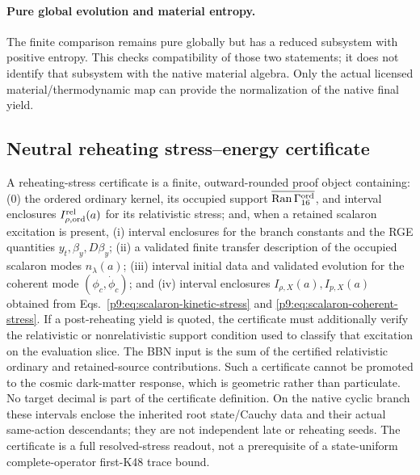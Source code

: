 \documentclass[12pt,a4paper]{article}
\begin{document}
\paragraph{Pure global evolution and material entropy.}
The finite comparison remains pure globally but has a reduced subsystem
with positive entropy. This checks compatibility of those two statements;
it does not identify that subsystem with the native material algebra.
Only the actual licensed material/thermodynamic map can provide the
normalization of the native final yield.



\subsection{Neutral reheating stress--energy certificate}
\label{p9:app:scalaron-abundance-certificate}

\begin{definition}
\label{p9:def:scalaron-abundance-certificate-datum}
A reheating-stress certificate is a finite, outward-rounded proof object
containing: (0) the ordered ordinary kernel, its occupied support
\(\overline{\operatorname{Ran}\Gamma_{16}^{\rm ord}}\), and interval
enclosures \(I_{\rho,\rm ord}^{\rm rel}(a)\) for its relativistic stress; and,
when a retained scalaron excitation is present, (i) interval enclosures for
the branch constants and the RGE quantities
\(y_t,\beta_y,D\beta_y\); (ii) a validated finite transfer description of the
occupied scalaron modes \(n_\lambda(a)\); (iii) interval initial data and
validated evolution for the coherent mode \((\phi_c,\dot\phi_c)\); and
(iv) interval enclosures \(I_{\rho,X}(a),I_{p,X}(a)\) obtained from
Eqs.~\eqref{p9:eq:scalaron-kinetic-stress} and
\eqref{p9:eq:scalaron-coherent-stress}.  If a post-reheating yield is quoted,
the certificate must additionally verify the relativistic or
nonrelativistic support condition used to classify that excitation on the
evaluation slice.  The BBN input is the sum of the certified relativistic
ordinary and retained-source contributions.  Such a certificate cannot be promoted to the cosmic
dark-matter response, which is geometric rather than particulate.  No target
decimal is part of the certificate definition.  On the native cyclic branch
these intervals enclose the inherited root state/Cauchy data and their actual
same-action descendants; they are not independent late or reheating seeds.
The certificate is a full resolved-stress readout, not a prerequisite of a
state-uniform complete-operator first-K48 trace bound.
\end{definition}
\end{document}
